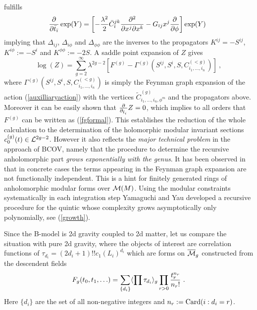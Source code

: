 \documentclass[12pt]{article}
\begin{document}
fulfills
\begin{equation}
{\partial \over \partial {\bar t_{\bar \imath}}} \exp(Y) =\left[ -{\lambda ^2\over 2}
\bar C^{jk}_{\bar \imath} {\partial^2 \over \partial x^j \partial x^k} -
G_{\bar \imath j}  x^j {\partial \over \partial \phi} \right]\exp(Y) \
                \end{equation}
implying that  $\Delta_{ij}$, $\Delta_{i\phi}$ and $\Delta_{\phi\phi}$ are the inverses
to the propagators $K^{ij}=-S^{ij}$, $K^{i\phi}:=-S^i$ and  $K^{\phi\phi}:=-2S$. A
saddle point expansion of $Z$ gives
\begin{equation}
\log(Z)=\sum_{g=2}^{\infty} \lambda^{2g-2}\left[F^{(g)}-
\Gamma^{(g)}(S^{ij},S^i,S, C^{(<g)}_{i_1,\ldots,i_n})\right]\ ,
\end{equation}
where  $\Gamma^{(g)}(S^{ij},S^i,S, C^{(<g)}_{i_1,\ldots,i_n})$ is
simply the Feynman graph expansion of the action
(\ref{auxilliaryaction}) with the vertices $\tilde
C^{(g)}_{i_1,\ldots,i_n,\phi^{m}}$ and the propagators above.
Moreover it can be easily shown that ${\partial \over
\partial_{\bar t_i}}Z=0$, which implies to all orders that
$F^{(g)}$ can be written as (\ref{fgformal}). This establishes the
reduction of the whole calculation to the determination of the
holomorphic modular invariant sections $c^{(g)}_0(t)\in {\cal
L}^{2g-2}$. However it also reflects the {\sl major technical
problem} in the approach of BCOV, namely that the procedure to
determine the recursive anholomorphic part {\sl grows
exponentially with the genus}. It has been observed in
\cite{Katz:1999} that in concrete cases the terms appearing in the
Feynman graph expansion are not functionally independent. This is a
hint for finitely generated  rings of anholomorphic modular
forms over ${\cal M}(M)$. Using the modular constraints
systematically in each integration step Yamaguchi and Yau
developed a recursive procedure for the quintic whose complexity grows
asymptotically only polynomially, see (\ref{growth}).

Since the B-model is 2d gravity coupled to 2d matter, let us
compare the situation with pure  2d gravity, where the objects of
interest are  correlation functions of $\tau_{d_i}=(2d_i+1)!!
c_1(L_i)^{d_i}$  which are forms on ${\overline {\cal M}_g}$
constructed from the descendent fields
\begin{equation}
F_g(t_0,t_1,\ldots )=\sum_{\{d_i\}} \langle \prod \tau_{d_i}\rangle_g
\prod_{r>0} {t_r^{n_r}\over n_r!}\ .
\end{equation}
Here $\{d_i\}$ are the set of all non-negative integers and  $n_r:={\rm Card}(i:d_i=r)$.
\end{document}
